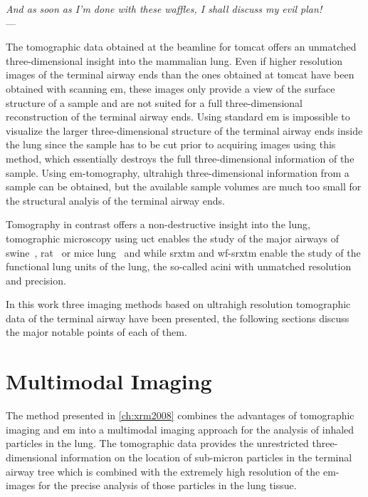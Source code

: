 \acresetall
{}\label{ch:discussion}
\begin{flushright}{\slshape And as soon as I'm done with these waffles, I shall discuss my evil plan!} \\ \medskip
	---  \citep{Zim}
\end{flushright}

\vfill

The tomographic data obtained at the beamline for \ac{tomcat} offers an unmatched three-dimensional insight into the mammalian lung. Even if higher resolution images of the terminal airway ends than the ones obtained at \ac{tomcat} have been obtained with scanning \ac{em}, these images only provide a view of the surface structure of a sample and are not suited for a full three-dimensional reconstruction of the terminal airway ends. Using standard \ac{em} is impossible to visualize the larger three-dimensional structure of the terminal airway ends inside the lung since the sample has to be cut prior to acquiring images using this method, which essentially destroys the full three-dimensional information of the sample. Using \ac{em}-tomography, ultrahigh three-dimensional information from a sample can be obtained, but the available sample volumes are much too small for the structural analyis of the terminal airway ends.

Tomography in contrast offers a non-destructive insight into the lung, tomographic microscopy using \ac{uct} enables the study of the major airways of swine~\cite{Litzlbauer2006}, rat~\cite{Langheinrich2004a,Sharif2010} or mice lung~\cite{Langheinrich2004,Ritman2005} and while \ac{srxtm} and \ac{wf-srxtm} enable the study of the functional lung units of the lung, the so-called acini with unmatched resolution and precision.

In this work three imaging methods based on ultrahigh resolution tomographic data of the terminal airway have been presented, the following sections discuss the major notable points of each of them.

\section{Multimodal Imaging}
The method presented in \autoref{ch:xrm2008} combines the advantages of tomographic imaging and \ac{em} into a multimodal imaging approach for the analysis of inhaled particles in the lung. The tomographic data provides the unrestricted three-dimensional information on the location of sub-micron particles in the terminal airway tree which is combined with the extremely high resolution of the \ac{em}-images for the precise analysis of those particles in the lung tissue.

